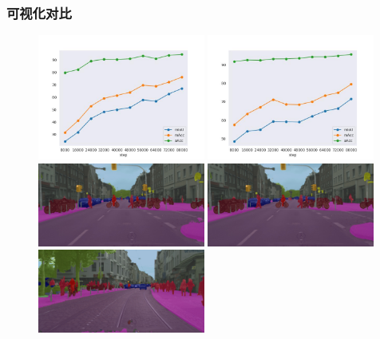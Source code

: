\documentclass[12pt]{ctexart}
\begin{document}
\subsubsection{可视化对比}
\begin{figure}[H]  %
    \centering        %
    \includegraphics[width=0.49\textwidth]{result/plot/acc_deeplabv3plus.jpg}
    \includegraphics[width=0.49\textwidth]{result/plot/acc_deeplabv3plus_hrnet.jpg}
    \includegraphics[width=0.49\textwidth]{result/plot/result_deeplabv3plus.jpg}
    \includegraphics[width=0.49\textwidth]{result/plot/result_deeplabv3plus_hrnet.jpg}
    \includegraphics[width=0.49\textwidth]{result/plot/result_1_deeplabv3plus.jpg}

\end{figure}
\end{document}
